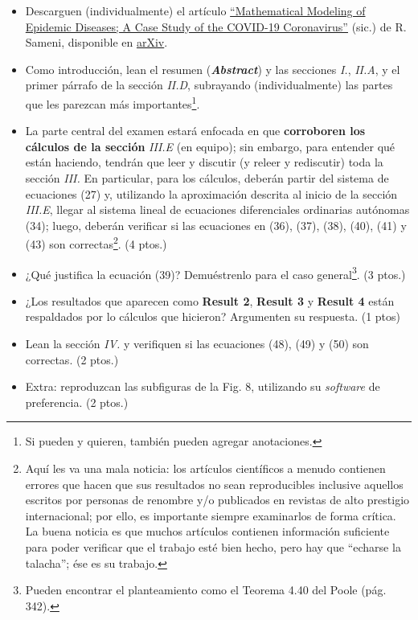 \documentclass[a4paper]{article}
\begin{document}
\begin{itemize}
    \item Descarguen (individualmente) el artículo \href{https://arxiv.org/abs/2003.11371}{``Mathematical Modeling of Epidemic Diseases; A Case Study of the COVID-19 Coronavirus''} (sic.) de R. Sameni, disponible en \href{https://arxiv.org}{arXiv}.
    \item Como introducción, lean el resumen (\emph{\textbf{Abstract}}) y las secciones \emph{I.}, \emph{II.A}, y el primer párrafo de la sección \emph{II.D}, subrayando (individualmente) las partes que les parezcan más importantes\footnote{Si pueden y quieren, también pueden agregar anotaciones.}.
    \item La parte central del examen estará enfocada en que \textbf{corroboren los cálculos de la sección} \emph{III.E} (en equipo); sin embargo, para entender qué están haciendo, tendrán que leer y discutir (y releer y rediscutir) toda la sección \emph{III.} En particular, para los cálculos, deberán partir del sistema de ecuaciones (27) y, utilizando la aproximación descrita al inicio de la sección \emph{III.E}, llegar al sistema lineal de ecuaciones diferenciales ordinarias autónomas (34); luego, deberán verificar si las ecuaciones en (36), (37), (38), (40), (41) y (43) son correctas\footnote{Aquí les va una mala noticia: los artículos científicos a menudo contienen errores que hacen que sus resultados no sean reproducibles \textemdash inclusive aquellos escritos por personas de renombre y/o publicados en revistas de alto prestigio internacional\textemdash; por ello, es importante siempre examinarlos de forma crítica. La buena noticia es que muchos artículos contienen información suficiente para poder verificar que el trabajo esté bien hecho, pero hay que ``echarse la talacha''; ése es su trabajo.}. (4 ptos.)
    \item ¿Qué justifica la ecuación (39)? Demuéstrenlo para el caso general\footnote{Pueden encontrar el planteamiento como el Teorema 4.40 del Poole (pág. 342).}. (3 ptos.)
    \item ¿Los resultados que aparecen como \textbf{Result 2}, \textbf{Result 3} y \textbf{Result 4} están respaldados por lo cálculos que hicieron? Argumenten su respuesta. (1 ptos)
    \item Lean la sección \emph{IV.} y verifiquen si las ecuaciones (48), (49) y (50) son correctas. (2 ptos.)
    \item Extra: reproduzcan las subfiguras de la Fig. 8, utilizando su \emph{software} de preferencia. (2 ptos.)
\end{itemize}
\end{document}
